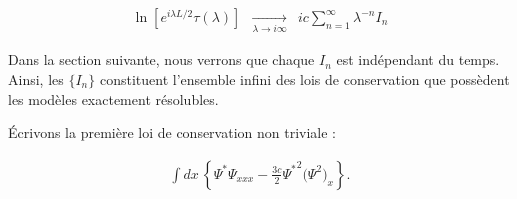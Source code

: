 \begin{eqnarray}
	\ln \left [ e^{i \lambda L /2 } \tau ( \lambda ) \right ]  & \underset{ \lambda \to i \infty }{ \longrightarrow}& ic \sum_{n = 1 }^\infty \lambda^{-n} I_n  	
\end{eqnarray}

Dans la section suivante, nous verrons que chaque \( I_n \) est indépendant du temps. Ainsi, les \( \{ I_n \} \) constituent l'ensemble infini des lois de conservation que possèdent les modèles exactement résolubles.

Écrivons la première loi de conservation non triviale : 

\begin{eqnarray}
	\int dx \, \left \{  \Psi^\ast \Psi_{xxx} - \frac{3c}{2} {\Psi^\ast}^2 \Big ( \Psi^2  \Big )_x \right \} .	
\end{eqnarray}






